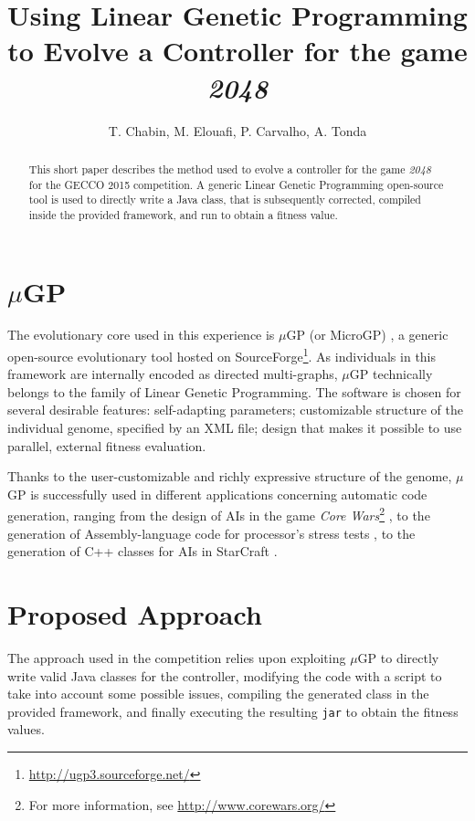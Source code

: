 \documentclass[11pt,twocolumn]{article}
\title{ \vspace{-3cm}Using Linear Genetic Programming\\to Evolve a Controller for the game \emph{2048}}
\author{T. Chabin, M. Elouafi, P. Carvalho, A. Tonda}
\begin{document}
\maketitle

\begin{abstract}

This short paper describes the method used to evolve a controller for the game \emph{2048} for the GECCO 2015 competition. A generic Linear Genetic Programming open-source tool is used to directly write a Java class, that is subsequently corrected, compiled inside the provided framework, and run to obtain a fitness value.



\end{abstract}

\vspace{-0.45cm}

\section{$\mu$GP}

The evolutionary core used in this experience is $\mu$GP (or MicroGP) \cite{Squillero2005}, a generic open-source evolutionary tool hosted on SourceForge\footnote{\url{http://ugp3.sourceforge.net/}}. As individuals in this framework are internally encoded as directed multi-graphs, $\mu$GP technically belongs to the family of Linear Genetic Programming. The software is chosen for several desirable features: self-adapting parameters; customizable structure of the individual genome, specified by an XML file; design that makes it possible to use parallel, external fitness evaluation.

Thanks to the user-customizable and richly expressive structure of the genome, $\mu$GP is successfully used in different applications concerning automatic code generation, ranging from the design of AIs in the game \emph{Core Wars}\footnote{For more information, see \url{http://www.corewars.org/}} \cite{Corno2005}, to the generation of Assembly-language code for processor's stress tests \cite{Corno2003}, %
to the generation of C++ classes for AIs in StarCraft \cite{Garcia2015}.

\section{Proposed Approach}

The approach used in the competition relies upon exploiting $\mu$GP to directly write valid Java classes for the controller, modifying the code with a script to take into account some possible issues, compiling the generated class in the provided framework, and finally executing the resulting \texttt{jar} to obtain the fitness values.
\end{document}
